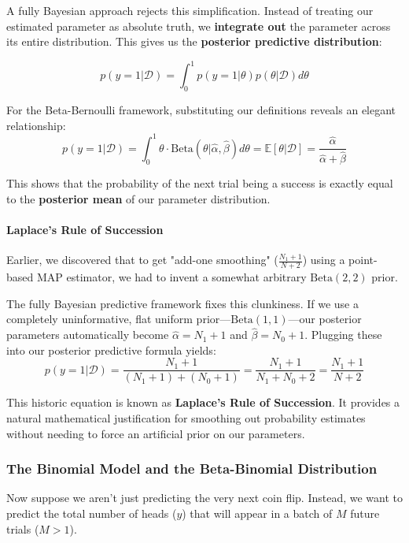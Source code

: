 \documentclass{article}
\begin{document}
A fully Bayesian approach rejects this simplification. Instead of treating our estimated parameter as absolute truth, we \textbf{integrate out} the parameter across its entire distribution. This gives us the \textbf{posterior predictive distribution}:

\begin{equation}
p(y = 1|\mathcal{D}) = \int_0^1 p(y = 1|\theta)p(\theta|\mathcal{D})d\theta
\end{equation}

For the Beta-Bernoulli framework, substituting our definitions reveals an elegant relationship:
\begin{equation}
p(y = 1|\mathcal{D}) = \int_0^1 \theta \cdot \text{Beta}(\theta|\hat{\alpha}, \hat{\beta})d\theta = \mathbb{E}[\theta|\mathcal{D}] = \frac{\hat{\alpha}}{\hat{\alpha} + \hat{\beta}}
\end{equation}

This shows that the probability of the next trial being a success is exactly equal to the \textbf{posterior mean} of our parameter distribution.

\paragraph{Laplace's Rule of Succession}
Earlier, we discovered that to get "add-one smoothing" ($\frac{N_1+1}{N+2}$) using a point-based MAP estimator, we had to invent a somewhat arbitrary $\text{Beta}(2,2)$ prior. 

The fully Bayesian predictive framework fixes this clunkiness. If we use a completely uninformative, flat uniform prior—$\text{Beta}(1,1)$—our posterior parameters automatically become $\hat{\alpha} = N_1 + 1$ and $\hat{\beta} = N_0 + 1$. Plugging these into our posterior predictive formula yields:
\begin{equation}
p(y = 1|\mathcal{D}) = \frac{N_1 + 1}{(N_1 + 1) + (N_0 + 1)} = \frac{N_1 + 1}{N_1 + N_0 + 2} = \frac{N_1 + 1}{N + 2}
\end{equation}

This historic equation is known as \textbf{Laplace's Rule of Succession}. It provides a natural mathematical justification for smoothing out probability estimates without needing to force an artificial prior on our parameters.

\subsubsection{The Binomial Model and the Beta-Binomial Distribution}
Now suppose we aren't just predicting the very next coin flip. Instead, we want to predict the total number of heads ($y$) that will appear in a batch of $M$ future trials ($M > 1$). 
\end{document}
